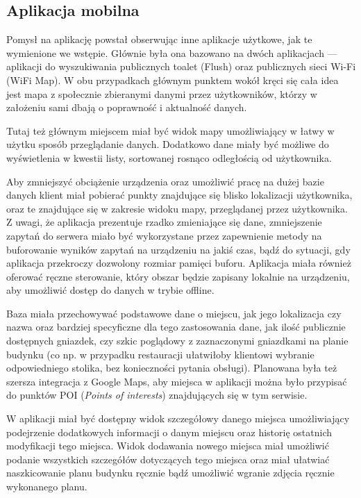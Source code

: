 \documentclass[polish,polish,a4paper,12pt]{article}
\begin{document}
	\subsection{Aplikacja mobilna}

	Pomysł na aplikację powstał obserwując inne aplikacje użytkowe, jak te wymienione we wstępie. Głównie była ona bazowano na dwóch aplikacjach — aplikacji do wyszukiwania publicznych toalet (Flush) oraz publicznych sieci Wi-Fi (WiFi Map). W obu przypadkach głównym punktem wokół kręci się cała idea jest mapa z społecznie zbieranymi danymi przez użytkowników, którzy w założeniu sami dbają o poprawność i aktualność danych.

	Tutaj też głównym miejscem miał być widok mapy umożliwiający w łatwy w użytku sposób przeglądanie danych. Dodatkowo dane miały być możliwe do wyświetlenia w kwestii listy, sortowanej rosnąco odległością od użytkownika.

	Aby zmniejszyć obciążenie urządzenia oraz umożliwić pracę na dużej bazie danych klient miał pobierać punkty znajdujące się blisko lokalizacji użytkownika, oraz te znajdujące się w zakresie widoku mapy, przeglądanej przez użytkownika. Z uwagi, że aplikacja prezentuje rzadko zmieniające się dane, zmniejszenie zapytań do serwera miało być wykorzystane przez zapewnienie metody na buforowanie wyników zapytań na urządzeniu na jakiś czas, bądź do sytuacji, gdy aplikacja przekroczy dozwolony rozmiar pamięci buforu. Aplikacja miała również oferować ręczne sterowanie, który obszar będzie zapisany lokalnie na urządzeniu, aby umożliwić dostęp do danych w trybie offline.

	Baza miała przechowywać podstawowe dane o miejscu, jak jego lokalizacja czy nazwa oraz bardziej specyficzne dla tego zastosowania dane, jak ilość publicznie dostępnych gniazdek, czy szkic poglądowy z zaznaczonymi gniazdkami na planie budynku (co np. w przypadku restauracji ułatwiłoby klientowi wybranie odpowiedniego stolika, bez konieczności pytania obsługi). Planowana była też szersza integracja z Google Maps, aby miejsca w aplikacji można było przypisać do punktów POI (\textit{Points of interests}) znajdujących się w tym serwisie.

	W aplikacji miał być dostępny widok szczegółowy danego miejsca umożliwiający podejrzenie dodatkowych informacji o danym miejscu oraz historię ostatnich modyfikacji tego miejsca. Widok dodawania nowego miejsca miał umożliwić podanie wszystkich szczegółów dotyczących tego miejsca oraz miał ułatwiać naszkicowanie planu budynku ręcznie bądź umożliwić wgranie zdjęcia ręcznie wykonanego planu.
\end{document}
